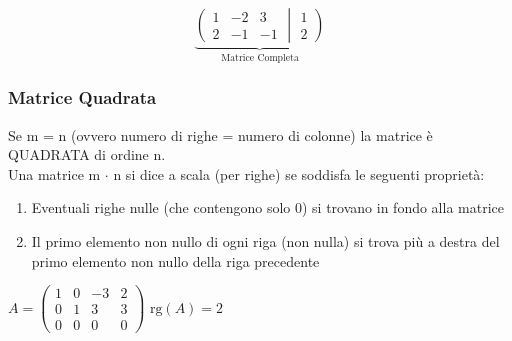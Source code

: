 \[
\underbrace{
\left(
\begin{matrix}
1 & -2 & 3 \\
2 & -1 & -1
\end{matrix}
\middle\vert
\begin{matrix}
1 \\ 2
\end{matrix}
\right)
} _{\text{Matrice Completa}}
\]

\begin{comment}
\begin{equation*}
\left(
%
\begin{array}{l}
	\alpha_T     \\
	\alpha_{T-1}
\end{array}
%
\middle\vert
%
\;y_{1:T-1},\,\boldsymbol{\theta}
%
\right)
\end{equation*}
\end{comment}


\newpage

\subsubsection{Matrice Quadrata}

\textsf{\small Se m = n (ovvero numero di righe = numero di colonne) la matrice è QUADRATA di ordine n.} \\


\textsf{\small Una matrice m $\cdot$ n si dice a scala (per righe) se soddisfa le seguenti proprietà: } \\

\begin{enumerate}
	\item \textsf{\small Eventuali righe nulle (che contengono solo 0) si trovano in fondo alla matrice}
	\item \textsf{\small Il primo elemento non nullo di ogni riga (non nulla) si trova più a destra del primo elemento non nullo della riga precedente}
\end{enumerate}

\(
A =
	\begin{pmatrix}
		1 & 0 & -3 & 2\\
		0 & 1 & 3 & 3 \\
		0 & 0 & 0 & 0
	\end{pmatrix}
\)
\( \text{rg}(A) = 2\)

